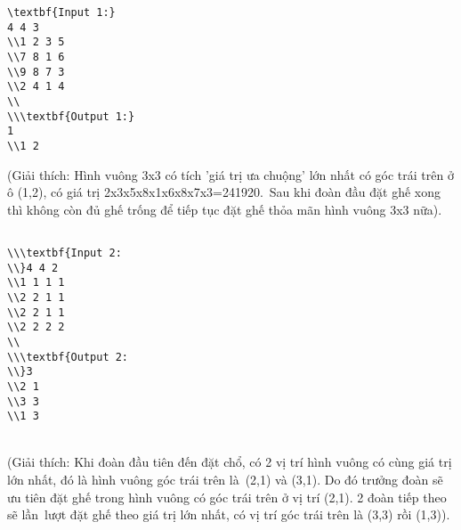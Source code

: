 \begin{verbatim}
\textbf{Input 1:}
4 4 3
\\1 2 3 5
\\7 8 1 6
\\9 8 7 3
\\2 4 1 4
\\
\\\textbf{Output 1:}
1
\\1 2\end{verbatim}

   (Giải thích: Hình vuông 3x3 có tích 'giá trị ưa chuộng' lớn nhất có góc trái trên ở ô (1,2), có giá trị 2x3x5x8x1x6x8x7x3=241920. Sau khi đoàn đầu đặt ghế xong thì không còn đủ ghế trống để tiếp tục đặt ghế thỏa mãn hình vuông 3x3 nữa).  
\begin{verbatim}

\\\textbf{Input 2:
\\}4 4 2
\\1 1 1 1
\\2 2 1 1
\\2 2 1 1
\\2 2 2 2
\\
\\\textbf{Output 2:
\\}3
\\2 1
\\3 3
\\1 3\end{verbatim}


\\   (Giải thích: Khi đoàn đầu tiên đến đặt chổ, có 2 vị trí hình vuông có cùng giá trị lớn nhất, đó là hình vuông góc trái trên là (2,1) và (3,1). Do đó trưởng đoàn sẽ ưu tiên đặt ghế trong hình vuông có góc trái trên ở vị trí (2,1). 2 đoàn tiếp theo sẽ lần lượt đặt ghế theo giá trị lớn nhất, có vị trí góc trái trên là (3,3) rồi (1,3)).